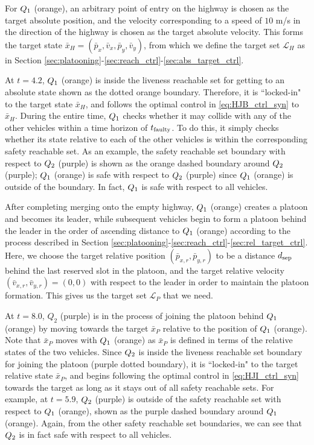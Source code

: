 For $Q_{1}$ (orange), an arbitrary point of entry on the highway is chosen as the target absolute position, and the velocity corresponding to a speed of $10$ m/s in the direction of the highway is chosen as the target absolute velocity. This forms the target state $\bar{x}_H=(\bar{p}_x, \bar{v}_x, \bar{p}_y, \bar{v}_y)$, from which we define the target set $\mathcal{L}_H$ as in Section \ref{sec:platooning}-\ref{sec:reach_ctrl}-\ref{sec:abs_target_ctrl}.

At $t=4.2$, $Q_{1}$ (orange) is inside the liveness reachable set for getting to an absolute state shown as the dotted orange boundary. Therefore, it is ``locked-in" to the target state $\bar{x}_H$, and follows the optimal control in \eqref{eq:HJB_ctrl_syn} to $\bar{x}_H$. During the entire time, $Q_{1}$ checks whether it may collide with any of the other vehicles within a time horizon of $t_\text{faulty}$. To do this, it simply checks whether its state relative to each of the other vehicles is within the corresponding safety reachable set. As an example, the safety reachable set boundary with respect to $Q_{2}$ (purple) is shown as the orange dashed boundary around $Q_{2}$ (purple); $Q_{1}$ (orange) is safe with respect to $Q_{2}$ (purple) since $Q_{1}$ (orange) is outside of the boundary. In fact, $Q_{1}$ is safe with respect to all vehicles.

After completing merging onto the empty highway, $Q_{1}$ (orange) creates a platoon and becomes its leader, while subsequent vehicles begin to form a platoon behind the leader in the order of ascending distance to $Q_{1}$ (orange) according to the process described in Section \ref{sec:platooning}-\ref{sec:reach_ctrl}-\ref{sec:rel_target_ctrl}. Here, we choose the target relative position $(\bar{p}_{x,r}, \bar{p}_{y,r})$ to be a distance $d_\text{sep}$ behind the last reserved slot in the platoon, and the target relative velocity $(\bar{v}_{x,r}, \bar{v}_{y,r}) = (0,0)$ with respect to the leader in order to maintain the platoon formation. This gives us the target set $\mathcal{L}_P$ that we need.

At $t=8.0$, $Q_2$ (purple) is in the process of joining the platoon behind $Q_{1}$ (orange) by moving towards the target $\bar{x}_P$ relative to the position of $Q_{1}$ (orange). Note that $\bar{x}_P$ moves with $Q_{1}$ (orange) as $\bar{x}_P$ is defined in terms of the relative states of the two vehicles. Since $Q_{2}$ is inside the liveness reachable set boundary for joining the platoon (purple dotted boundary), it is ``locked-in" to the target relative state $\bar{x}_P$, and begins following the optimal control in \eqref{eq:HJI_ctrl_syn} towards the target as long as it stays out of all safety reachable sets. For example, at $t=5.9$, $Q_{2}$ (purple) is outside of the safety reachable set with respect to $Q_{1}$ (orange), shown as the purple dashed boundary around $Q_{1}$ (orange). Again, from the other safety reachable set boundaries, we can see that $Q_{2}$ is in fact safe with respect to all vehicles.

